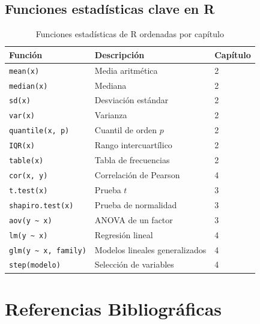 \documentclass[
  10pt,           %
  twoside,        %
  openright       %
]{book}
\begin{document}
\section{Funciones estadísticas clave en R}

\begin{table}[H]
\centering
\caption{Funciones estadísticas de R ordenadas por capítulo}
\begin{tabular}{@{}lll@{}}
\toprule
Función & Descripción & Capítulo \\
\midrule
\texttt{mean(x)} & Media aritmética & 2 \\
\texttt{median(x)} & Mediana & 2 \\
\texttt{sd(x)} & Desviación estándar & 2 \\
\texttt{var(x)} & Varianza & 2 \\
\texttt{quantile(x, p)} & Cuantil de orden $p$ & 2 \\
\texttt{IQR(x)} & Rango intercuartílico & 2 \\
\texttt{table(x)} & Tabla de frecuencias & 2 \\
\texttt{cor(x, y)} & Correlación de Pearson & 4 \\
\texttt{t.test(x)} & Prueba $t$ & 3 \\
\texttt{shapiro.test(x)} & Prueba de normalidad & 3 \\
\texttt{aov(y \textasciitilde{} x)} & ANOVA de un factor & 3 \\
\texttt{lm(y \textasciitilde{} x)} & Regresión lineal & 4 \\
\texttt{glm(y \textasciitilde{} x, family)} & Modelos lineales generalizados & 4 \\
\texttt{step(modelo)} & Selección de variables & 4 \\
\bottomrule
\end{tabular}
\end{table}

\chapter*{Referencias Bibliográficas}
\end{document}
